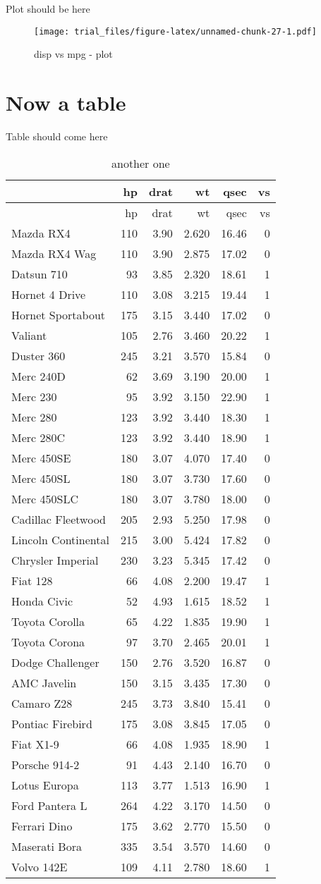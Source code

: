 \documentclass[]{article}
\begin{document}
\lipsum

Plot should be here

\begin{figure}[htbp]
\centering
\texttt{[image: trial\_files/figure-latex/unnamed-chunk-27-1.pdf]}
\caption{disp vs mpg - plot}
\end{figure}

\section{Now a table}\label{now-a-table-6}

\lipsum

Table should come here

\begin{longtable}[]{@{}lrrrrr@{}}
\caption{another one}\tabularnewline
\toprule
& hp & drat & wt & qsec & vs\tabularnewline
\midrule
\endfirsthead
\toprule
& hp & drat & wt & qsec & vs\tabularnewline
\midrule
\endhead
Mazda RX4 & 110 & 3.90 & 2.620 & 16.46 & 0\tabularnewline
Mazda RX4 Wag & 110 & 3.90 & 2.875 & 17.02 & 0\tabularnewline
Datsun 710 & 93 & 3.85 & 2.320 & 18.61 & 1\tabularnewline
Hornet 4 Drive & 110 & 3.08 & 3.215 & 19.44 & 1\tabularnewline
Hornet Sportabout & 175 & 3.15 & 3.440 & 17.02 & 0\tabularnewline
Valiant & 105 & 2.76 & 3.460 & 20.22 & 1\tabularnewline
Duster 360 & 245 & 3.21 & 3.570 & 15.84 & 0\tabularnewline
Merc 240D & 62 & 3.69 & 3.190 & 20.00 & 1\tabularnewline
Merc 230 & 95 & 3.92 & 3.150 & 22.90 & 1\tabularnewline
Merc 280 & 123 & 3.92 & 3.440 & 18.30 & 1\tabularnewline
Merc 280C & 123 & 3.92 & 3.440 & 18.90 & 1\tabularnewline
Merc 450SE & 180 & 3.07 & 4.070 & 17.40 & 0\tabularnewline
Merc 450SL & 180 & 3.07 & 3.730 & 17.60 & 0\tabularnewline
Merc 450SLC & 180 & 3.07 & 3.780 & 18.00 & 0\tabularnewline
Cadillac Fleetwood & 205 & 2.93 & 5.250 & 17.98 & 0\tabularnewline
Lincoln Continental & 215 & 3.00 & 5.424 & 17.82 & 0\tabularnewline
Chrysler Imperial & 230 & 3.23 & 5.345 & 17.42 & 0\tabularnewline
Fiat 128 & 66 & 4.08 & 2.200 & 19.47 & 1\tabularnewline
Honda Civic & 52 & 4.93 & 1.615 & 18.52 & 1\tabularnewline
Toyota Corolla & 65 & 4.22 & 1.835 & 19.90 & 1\tabularnewline
Toyota Corona & 97 & 3.70 & 2.465 & 20.01 & 1\tabularnewline
Dodge Challenger & 150 & 2.76 & 3.520 & 16.87 & 0\tabularnewline
AMC Javelin & 150 & 3.15 & 3.435 & 17.30 & 0\tabularnewline
Camaro Z28 & 245 & 3.73 & 3.840 & 15.41 & 0\tabularnewline
Pontiac Firebird & 175 & 3.08 & 3.845 & 17.05 & 0\tabularnewline
Fiat X1-9 & 66 & 4.08 & 1.935 & 18.90 & 1\tabularnewline
Porsche 914-2 & 91 & 4.43 & 2.140 & 16.70 & 0\tabularnewline
Lotus Europa & 113 & 3.77 & 1.513 & 16.90 & 1\tabularnewline
Ford Pantera L & 264 & 4.22 & 3.170 & 14.50 & 0\tabularnewline
Ferrari Dino & 175 & 3.62 & 2.770 & 15.50 & 0\tabularnewline
Maserati Bora & 335 & 3.54 & 3.570 & 14.60 & 0\tabularnewline
Volvo 142E & 109 & 4.11 & 2.780 & 18.60 & 1\tabularnewline
\bottomrule
\end{longtable}
\end{document}
